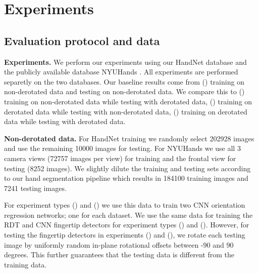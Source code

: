 \documentclass{bmvc2k}
\newcommand{\RNum}[1]{\uppercase\expandafter{\romannumeral #1\relax}}
\begin{document}

\section{Experiments} \label{sec:experiments}


\subsection{Evaluation protocol and data} \label{sec:evaluation}

\textbf{Experiments.} We perform our experiments using our HandNet database and the publicly available database NYUHands \cite{tompson14tog}. All experiments are performed separetly on the two databases. Our baseline results come from (\RNum{1}) training on non-derotated data and testing on non-derotated data. We compare this to (\RNum{2}) training on non-derotated data while testing with derotated data, (\RNum{3}) training on derotated data while testing with non-derotated data, (\RNum{4}) training on derotated data while testing with derotated data. 

\textbf{Non-derotated data.} For HandNet training we randomly select 202928 images and use the remaining 10000 images for testing. For NYUHands we use all 3 camera views (72757 images per view) for training and the frontal view for testing (8252 images). We slightly dilute the training and testing sets according to our hand segmentation pipeline which results in 184100 training images and 7241 testing images. 

For experiment types (\RNum{2}) and (\RNum{4}) we use this data to train two CNN orientation regression networks; one for each dataset. We use the same data for training the RDT and CNN fingertip detectors for experiment types (\RNum{1}) and (\RNum{2}). However, for testing the fingertip detectors in experiments (\RNum{1}) and (\RNum{3}), we rotate each testing image by uniformly random in-plane rotational offsets between -$90$ and $90$ degrees. This further guarantees that the testing data is different from the training data. 
\end{document}
